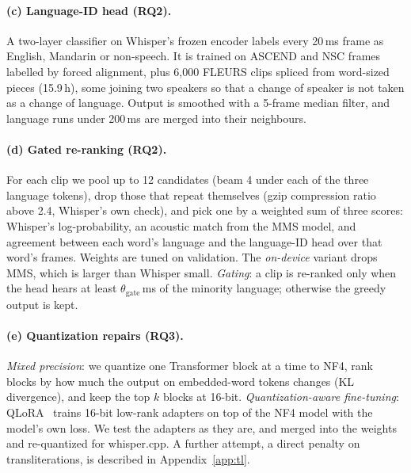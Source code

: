 \paragraph{(c) Language-ID head (RQ2).}
A two-layer classifier on Whisper's frozen encoder labels every 20\,ms frame as English, Mandarin or non-speech. It is trained on ASCEND and NSC frames labelled by forced alignment, plus 6{,}000 FLEURS clips spliced from word-sized pieces (15.9\,h), some joining two speakers so that a change of speaker is not taken as a change of language. Output is smoothed with a 5-frame median filter, and language runs under 200\,ms are merged into their neighbours.

\paragraph{(d) Gated re-ranking (RQ2).}
For each clip we pool up to 12 candidates (beam 4 under each of the three language tokens), drop those that repeat themselves (gzip compression ratio above 2.4, Whisper's own check), and pick one by a weighted sum of three scores: Whisper's log-probability, an acoustic match from the MMS model, and agreement between each word's language and the language-ID head over that word's frames. Weights are tuned on validation. The \emph{on-device} variant drops MMS, which is larger than Whisper small. \emph{Gating}: a clip is re-ranked only when the head hears at least $\theta_{\text{gate}}$\,ms of the minority language; otherwise the greedy output is kept.

\paragraph{(e) Quantization repairs (RQ3).}
\emph{Mixed precision}: we quantize one Transformer block at a time to NF4, rank blocks by how much the output on embedded-word tokens changes (KL divergence), and keep the top $k$ blocks at 16-bit. \emph{Quantization-aware fine-tuning}: QLoRA~\citep{dettmers2023qlora} trains 16-bit low-rank adapters on top of the NF4 model with the model's own loss. We test the adapters as they are, and merged into the weights and re-quantized for whisper.cpp. A further attempt, a direct penalty on transliterations, is described in Appendix~\ref{app:tl}.
